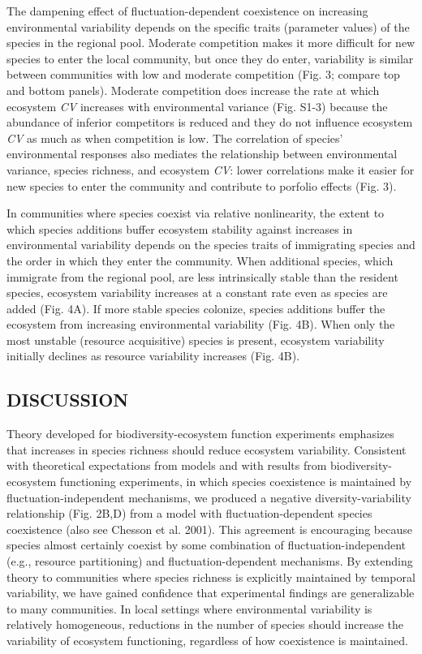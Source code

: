 \documentclass[12pt,]{article}
\begin{document}
The dampening effect of fluctuation-dependent coexistence on increasing
environmental variability depends on the specific traits (parameter
values) of the species in the regional pool. Moderate competition makes
it more difficult for new species to enter the local community, but once
they do enter, variability is similar between communities with low and
moderate competition (Fig. 3; compare top and bottom panels). Moderate
competition does increase the rate at which ecosystem \emph{CV}
increases with environmental variance (Fig. S1-3) because the abundance
of inferior competitors is reduced and they do not influence ecosystem
\emph{CV} as much as when competition is low. The correlation of
species' environmental responses also mediates the relationship between
environmental variance, species richness, and ecosystem \emph{CV}: lower
correlations make it easier for new species to enter the community and
contribute to porfolio effects (Fig. 3).

In communities where species coexist via relative nonlinearity, the
extent to which species additions buffer ecosystem stability against
increases in environmental variability depends on the species traits of
immigrating species and the order in which they enter the community.
When additional species, which immigrate from the regional pool, are
less intrinsically stable than the resident species, ecosystem
variability increases at a constant rate even as species are added (Fig.
4A). If more stable species colonize, species additions buffer the
ecosystem from increasing environmental variability (Fig. 4B). When only
the most unstable (resource acquisitive) species is present, ecosystem
variability initially declines as resource variability increases (Fig.
4B).

\subsection{DISCUSSION}\label{discussion}

Theory developed for biodiversity-ecosystem function experiments
emphasizes that increases in species richness should reduce ecosystem
variability. Consistent with theoretical expectations from models and
with results from biodiversity-ecosystem functioning experiments, in
which species coexistence is maintained by fluctuation-independent
mechanisms, we produced a negative diversity-variability relationship
(Fig. 2B,D) from a model with fluctuation-dependent species coexistence
(also see Chesson et al. 2001). This agreement is encouraging because
species almost certainly coexist by some combination of
fluctuation-independent (e.g., resource partitioning) and
fluctuation-dependent mechanisms. By extending theory to communities
where species richness is explicitly maintained by temporal variability,
we have gained confidence that experimental findings are generalizable
to many communities. In local settings where environmental variability
is relatively homogeneous, reductions in the number of species should
increase the variability of ecosystem functioning, regardless of how
coexistence is maintained.
\end{document}
